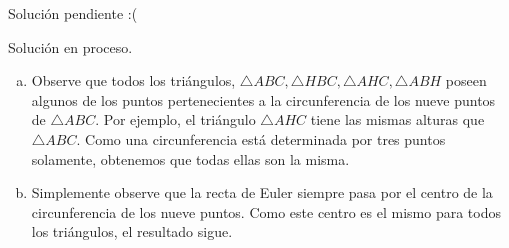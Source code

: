 \begin{sol}
	Soluci\'on pendiente :(
\end{sol}

\begin{sol}
	Soluci\'on en proceso.
\end{sol}

\begin{sol}
	\begin{enumerate}[a.]
		\item Observe que todos los tri\'angulos, $\triangle ABC,\triangle HBC,\triangle AHC,\triangle ABH$ poseen algunos  de los puntos pertenecientes a la circunferencia de los nueve puntos de $\triangle ABC$. Por ejemplo, el tri\'angulo $\triangle AHC$ tiene las mismas alturas que $\triangle ABC$. Como una circunferencia est\'a determinada por tres puntos solamente, obtenemos que todas ellas son la misma. 
		\item Simplemente observe que la recta de Euler siempre pasa por el centro de la circunferencia de los nueve puntos. Como este centro es el mismo para todos los tri\'angulos, el resultado sigue.
	\end{enumerate}
\end{sol}